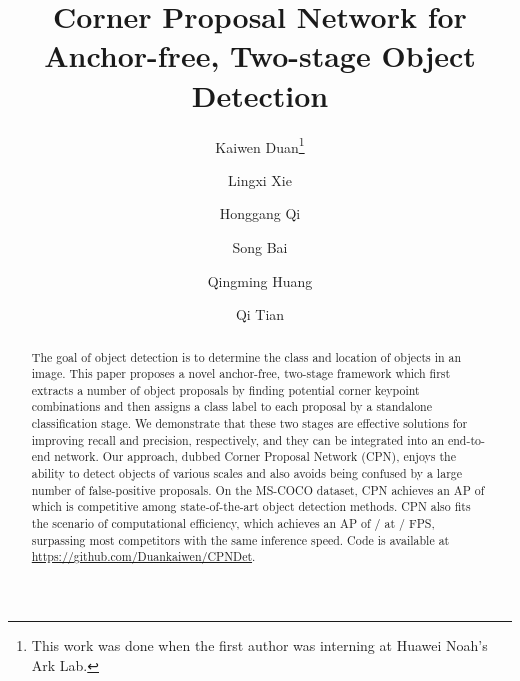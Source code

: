 \documentclass[runningheads]{llncs}
\begin{document}
\pagestyle{headings}
\mainmatter
\def\ECCVSubNumber{492}  

\title{Corner Proposal Network for Anchor-free, Two-stage Object Detection} 

\begin{comment}
\titlerunning{ECCV-20 submission ID \ECCVSubNumber} 
\authorrunning{ECCV-20 submission ID \ECCVSubNumber} 
\author{Anonymous ECCV submission}
\institute{Paper ID \ECCVSubNumber}
\end{comment}


\author{Kaiwen Duan\thanks{\scriptsize This work was done when the first author was interning at Huawei Noah's Ark Lab.} \and
Lingxi Xie \and
Honggang Qi \and
Song Bai \and
Qingming Huang \and
Qi Tian}



\maketitle
\vspace{-1ex}
\begin{abstract}
The goal of object detection is to determine the class and location of objects in an image. This paper proposes a novel anchor-free, two-stage framework which first extracts a number of object proposals by finding potential corner keypoint combinations and then assigns a class label to each proposal by a standalone classification stage. We demonstrate that these two stages are effective solutions for improving recall and precision, respectively, and they can be integrated into an end-to-end network. Our approach, dubbed Corner Proposal Network (CPN), enjoys the ability to detect objects of various scales and also avoids being confused by a large number of false-positive proposals. On the MS-COCO dataset, CPN achieves an AP of  which is competitive among state-of-the-art object detection methods. CPN also fits the scenario of computational efficiency, which achieves an AP of / at / FPS, surpassing most competitors with the same inference speed. Code is available at \url{https://github.com/Duankaiwen/CPNDet}.

\end{abstract}
\end{document}
